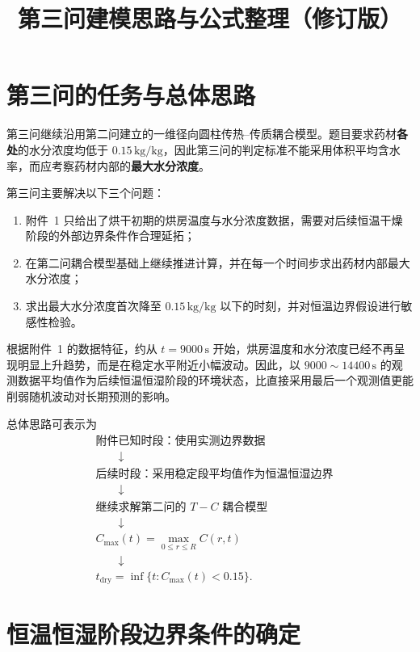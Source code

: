 \documentclass[UTF8,a4paper,12pt]{ctexart}
\title{第三问建模思路与公式整理（修订版）}
\author{}
\date{}
\begin{document}
\maketitle

\section{第三问的任务与总体思路}

第三问继续沿用第二问建立的一维径向圆柱传热--传质耦合模型。题目要求药材\textbf{各处}的水分浓度均低于
$0.15\,\mathrm{kg/kg}$，因此第三问的判定标准不能采用体积平均含水率，而应考察药材内部的\textbf{最大水分浓度}。

第三问主要解决以下三个问题：
\begin{enumerate}
    \item 附件~1 只给出了烘干初期的烘房温度与水分浓度数据，需要对后续恒温干燥阶段的外部边界条件作合理延拓；
    \item 在第二问耦合模型基础上继续推进计算，并在每一个时间步求出药材内部最大水分浓度；
    \item 求出最大水分浓度首次降至 $0.15\,\mathrm{kg/kg}$ 以下的时刻，并对恒温边界假设进行敏感性检验。
\end{enumerate}

根据附件~1 的数据特征，约从 $t=9000\,\mathrm{s}$ 开始，烘房温度和水分浓度已经不再呈现明显上升趋势，而是在稳定水平附近小幅波动。因此，以
$9000\sim14400\,\mathrm{s}$ 的观测数据平均值作为后续恒温恒湿阶段的环境状态，比直接采用最后一个观测值更能削弱随机波动对长期预测的影响。

总体思路可表示为
\[
\boxed{
\begin{aligned}
&\text{附件已知时段：使用实测边界数据}\\
&\qquad\downarrow\\
&\text{后续时段：采用稳定段平均值作为恒温恒湿边界}\\
&\qquad\downarrow\\
&\text{继续求解第二问的 }T-C\text{ 耦合模型}\\
&\qquad\downarrow\\
& C_{\max}(t)=\max_{0\le r\le R}C(r,t)\\
&\qquad\downarrow\\
& t_{\mathrm{dry}}
=\inf\{t:C_{\max}(t)<0.15\}.
\end{aligned}}
\]

\section{恒温恒湿阶段边界条件的确定}
\end{document}
